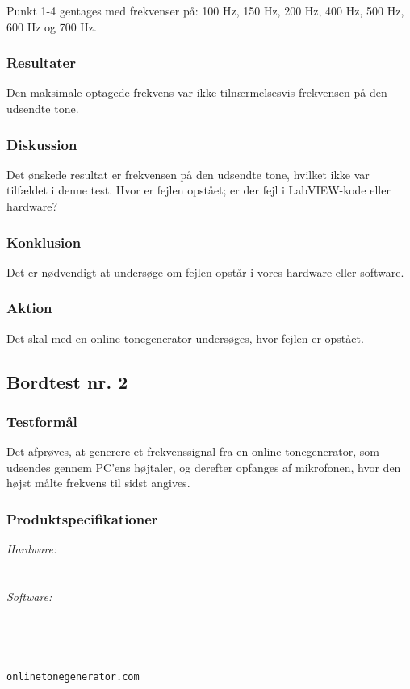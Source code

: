 			Punkt 1-4 gentages med frekvenser på: 100 Hz, 150 Hz, 200 Hz, 400 Hz, 500 Hz, 600 Hz og 700 Hz. 
			
			\subsubsection{Resultater}
			Den maksimale optagede frekvens var ikke tilnærmelsesvis frekvensen på den udsendte tone.
			\subsubsection{Diskussion}
			Det ønskede resultat er frekvensen på den udsendte tone, hvilket ikke var tilfældet i denne test. Hvor er fejlen opstået; er der fejl i LabVIEW-kode eller hardware? 
			\subsubsection{Konklusion}
			Det er nødvendigt at undersøge om fejlen opstår i vores hardware eller software. 
			\subsubsection{Aktion}
			Det skal med en online tonegenerator undersøges, hvor fejlen er opstået. 

	\subsection{Bordtest nr. 2} %
		\subsubsection{Testformål}
		Det afprøves, at generere et frekvenssignal fra en online tonegenerator, som udsendes gennem PC'ens højtaler, og derefter opfanges af mikrofonen, hvor den højst målte frekvens til sidst angives.  
		
		\subsubsection{Produktspecifikationer}
		
		\textit{Hardware:}\\
		\mikrofon\\
		\PC\\
	
		\textit{Software:}\\
		\labview\\
		\visa\\
		\vi\\
		\ardsw\\
		\texttt{onlinetonegenerator.com}
		
